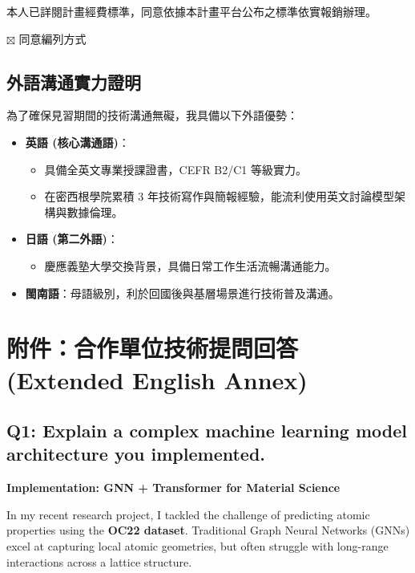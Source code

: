 \documentclass[12pt,a4paper]{article}
\begin{document}
本人已詳閱計畫經費標準，同意依據本計畫平台公布之標準依實報銷辦理。

\vspace{0.3cm}
$\boxtimes$ 同意編列方式

\subsection{外語溝通實力證明}

為了確保見習期間的技術溝通無礙，我具備以下外語優勢：
\begin{itemize}
    \item \textbf{英語 (核心溝通語)}：
    \begin{itemize}
        \item 具備全英文專業授課證書，CEFR B2/C1 等級實力。
        \item 在密西根學院累積 3 年技術寫作與簡報經驗，能流利使用英文討論模型架構與數據倫理。
    \end{itemize}
    \item \textbf{日語 (第二外語)}：
    \begin{itemize}
        \item 慶應義塾大學交換背景，具備日常工作生活流暢溝通能力。
    \end{itemize}
    \item \textbf{閩南語}：母語級別，利於回國後與基層場景進行技術普及溝通。
\end{itemize}

\newpage

\section*{附件：合作單位技術提問回答 (Extended English Annex)}

\subsection*{Q1: Explain a complex machine learning model architecture you implemented.}

\textbf{Implementation: GNN + Transformer for Material Science}

In my recent research project, I tackled the challenge of predicting atomic properties using the \textbf{OC22 dataset}. Traditional Graph Neural Networks (GNNs) excel at capturing local atomic geometries, but often struggle with long-range interactions across a lattice structure. 
\end{document}
